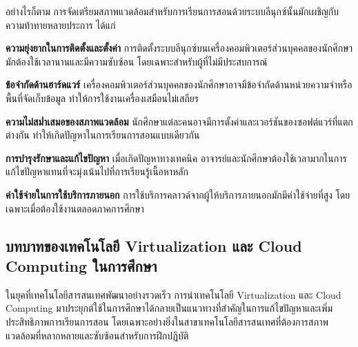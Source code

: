 \hspace*{1.5em} %
อย่างไรก็ตาม การจัดเตรียมสภาพแวดล้อมสำหรับการเรียนการสอนด้วยระบบลีนุกซ์นั้นมักเผชิญกับความท้าทายหลายประการ ได้แก่
\begin{mycustomitem}
    \item \textbf{ความยุ่งยากในการติดตั้งและตั้งค่า} การติดตั้งระบบลีนุกซ์บนเครื่องคอมพิวเตอร์ส่วนบุคคลของนักศึกษามักต้องใช้เวลานานและมีความซับซ้อน โดยเฉพาะสำหรับผู้ที่ไม่มีประสบการณ์
    \item \textbf{ข้อจำกัดด้านฮาร์ดแวร์} เครื่องคอมพิวเตอร์ส่วนบุคคลของนักศึกษาอาจมีข้อจำกัดด้านหน่วยความจำหรือพื้นที่จัดเก็บข้อมูล ทำให้การใช้งานเครื่องเสมือนไม่เสถียร
    \item \textbf{ความไม่สม่ำเสมอของสภาพแวดล้อม} นักศึกษาแต่ละคนอาจมีการตั้งค่าและเวอร์ชันของซอฟต์แวร์ที่แตกต่างกัน ทำให้เกิดปัญหาในการเรียนการสอนแบบเดียวกัน
    \item \textbf{การบำรุงรักษาและแก้ไขปัญหา} เมื่อเกิดปัญหาทางเทคนิค อาจารย์และนักศึกษาต้องใช้เวลามากในการแก้ไขปัญหาแทนที่จะมุ่งเน้นไปที่การเรียนรู้เนื้อหาหลัก
    \item \textbf{ค่าใช้จ่ายในการใช้บริการภายนอก} การใช้บริการคลาวด์จากผู้ให้บริการภายนอกมักมีค่าใช้จ่ายที่สูง โดยเฉพาะเมื่อต้องใช้งานตลอดภาคการศึกษา
\end{mycustomitem}



\subsection{บทบาทของเทคโนโลยี Virtualization และ Cloud Computing ในการศึกษา}

\hspace*{1.5em} %
ในยุคที่เทคโนโลยีสารสนเทศพัฒนาอย่างรวดเร็ว การนำเทคโนโลยี Virtualization และ Cloud Computing มาประยุกต์ใช้ในการศึกษาได้กลายเป็นแนวทางที่สำคัญในการแก้ไขปัญหาและเพิ่มประสิทธิภาพการเรียนการสอน โดยเฉพาะอย่างยิ่งในสาขาเทคโนโลยีสารสนเทศที่ต้องการสภาพแวดล้อมที่หลากหลายและซับซ้อนสำหรับการฝึกปฏิบัติ \parencite{clark2016blended}

